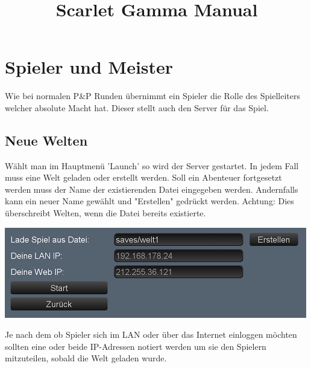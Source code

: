\documentclass[german,10pt,a4paper,twocolumn,colorscheme=darkblue]{orarticle}
\begin{document}
	\title{Scarlet Gamma Manual}
	\maketitle

	\tableofcontents
	
	\section{Spieler und Meister}
		Wie bei normalen P\&P Runden übernimmt ein Spieler die Rolle des Spielleiters welcher absolute Macht hat. Dieser stellt auch den Server für das Spiel.
	
		\subsection{Neue Welten}
			Wählt man im Hauptmenü 'Launch' so wird der Server gestartet. In jedem Fall muss eine Welt geladen oder erstellt werden. Soll ein Abenteuer fortgesetzt werden muss der Name der existierenden Datei eingegeben werden. Andernfalls kann ein neuer Name gewählt und "Erstellen" gedrückt werden. Achtung: Dies überschreibt Welten, wenn die Datei bereits existierte.
			
			\includegraphics[width=\linewidth]{img/launch}
			
			Je nach dem ob Spieler sich im LAN oder über das Internet einloggen möchten sollten eine oder beide IP-Adressen notiert werden um sie den Spielern mitzuteilen, sobald die Welt geladen wurde.
			
\end{document}

